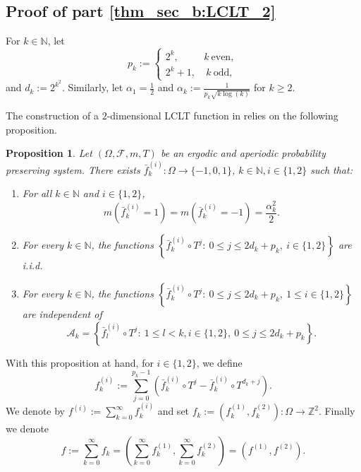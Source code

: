 \documentclass[12pt,reqno]{amsart}
\newcommand{\N}{\mathbb{N}}
\newcommand{\Z}{\mathbb{Z}}
\newtheorem{prop}[thm]{Proposition}
\theoremstyle{definition}
\begin{document}
\subsection{Proof of  part \ref{thm_sec_b:LCLT_2}}\label{sub:LCLT revisit}

For $k \in \N$, let
\[
p_k:=\begin{cases}
2^k, & k\ \text{even},\\
2^k+1, &\ k\ \text{odd},
\end{cases}
\] and
$d_k:=2^{k^2}$. Similarly, let $\alpha_1=\frac{1}{2}$ and $\alpha_k:=\frac{1}{p_k\sqrt{k\log(k)}}$ for $k\geq 2$. 


The construction of a $2$-dimensional LCLT function in \cite{kosloff_Sanadhya_2024} relies on the following proposition.

\begin{prop}\cite[Proposition 2.1. for $D=2$]{kosloff_Sanadhya_2024}\label{prop:functions_defn}
Let $(\Omega,\mathcal{F},m,T)$ be an ergodic and aperiodic probability preserving system. There exists $\bar{f}_k^{(i)}:\Omega\to \{-1,0,1\}$, $k\in\mathbb{N},i\in\{1,2\}$ such that:
\begin{enumerate}[label=(\alph*)]
\item\label{prop_sec_a:functions_defn} For all $k\in\mathbb{N}$ and $i\in\{1,2\}$, 
\[
m\left(\bar{f}_k^{(i)}=1\right)=m\left(\bar{f}_k^{(i)}=-1\right)=\frac{\alpha_k^2}{2}.
\]
\item\label{prop_sec_b:functions_defn} For every $k\in\N$, the functions $\left\{\bar{f}_k^{(i)}\circ T^j:\ 0\leq j\leq 2d_k+p_k,\ i\in\{1,2\}\right\}$ are i.i.d. 
\item\label{prop_sec_c:functions_defn} For every $k\in\N$, the functions $\left\{\bar{f}_k^{(i)}\circ T^j:\ 0\leq j\leq 2d_k+p_k,\ 1\leq i\in\{1,2\}\right\}$ are independent of 
\[
\mathcal{A}_k=\left\{\bar{f}_l^{(i)}\circ T^j:\ 1\leq l<k, i\in\{1,2\},\ 0\leq j\leq 2d_k+p_k\right\}. 
 \]
\end{enumerate}
\end{prop}
With this proposition at hand, for $i\in \{1,2\}$, we define
\[
f^{(i)}_k:=\sum_{j=0}^{p_k-1}\left(\bar{f}^{(i)}_k\circ T^j-\bar{f}^{(i)}_k\circ T^{d_k+j}\right).
\]
We denote by $f^{(i)}:=\sum_{k=0}^\infty f^{(i)}_k$ and set $f_k:=\left(f_k^{(1)},f_k^{(2)}\right):\Omega \to \Z^2$. Finally we denote 
\[
f:=\sum_{k=0}^\infty f_k = \left(\sum_{k=0}^\infty f^{(1)}_k, \sum_{k=0}^\infty f^{(2)}_k \right) = (f^{(1)},f^{(2)}).
\]
\end{document}
